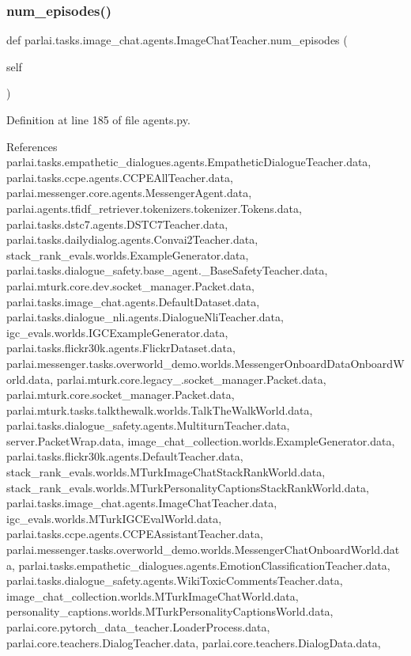 \subsubsection{\texorpdfstring{num\+\_\+episodes()}{num\_episodes()}}
{\footnotesize\ttfamily def parlai.\+tasks.\+image\+\_\+chat.\+agents.\+Image\+Chat\+Teacher.\+num\+\_\+episodes (\begin{DoxyParamCaption}\item[{}]{self }\end{DoxyParamCaption})}



Definition at line 185 of file agents.\+py.



References parlai.\+tasks.\+empathetic\+\_\+dialogues.\+agents.\+Empathetic\+Dialogue\+Teacher.\+data, parlai.\+tasks.\+ccpe.\+agents.\+C\+C\+P\+E\+All\+Teacher.\+data, parlai.\+messenger.\+core.\+agents.\+Messenger\+Agent.\+data, parlai.\+agents.\+tfidf\+\_\+retriever.\+tokenizers.\+tokenizer.\+Tokens.\+data, parlai.\+tasks.\+dstc7.\+agents.\+D\+S\+T\+C7\+Teacher.\+data, parlai.\+tasks.\+dailydialog.\+agents.\+Convai2\+Teacher.\+data, stack\+\_\+rank\+\_\+evals.\+worlds.\+Example\+Generator.\+data, parlai.\+tasks.\+dialogue\+\_\+safety.\+base\+\_\+agent.\+\_\+\+Base\+Safety\+Teacher.\+data, parlai.\+mturk.\+core.\+dev.\+socket\+\_\+manager.\+Packet.\+data, parlai.\+tasks.\+image\+\_\+chat.\+agents.\+Default\+Dataset.\+data, parlai.\+tasks.\+dialogue\+\_\+nli.\+agents.\+Dialogue\+Nli\+Teacher.\+data, igc\+\_\+evals.\+worlds.\+I\+G\+C\+Example\+Generator.\+data, parlai.\+tasks.\+flickr30k.\+agents.\+Flickr\+Dataset.\+data, parlai.\+messenger.\+tasks.\+overworld\+\_\+demo.\+worlds.\+Messenger\+Onboard\+Data\+Onboard\+World.\+data, parlai.\+mturk.\+core.\+legacy\+\_.\+socket\+\_\+manager.\+Packet.\+data, parlai.\+mturk.\+core.\+socket\+\_\+manager.\+Packet.\+data, parlai.\+mturk.\+tasks.\+talkthewalk.\+worlds.\+Talk\+The\+Walk\+World.\+data, parlai.\+tasks.\+dialogue\+\_\+safety.\+agents.\+Multiturn\+Teacher.\+data, server.\+Packet\+Wrap.\+data, image\+\_\+chat\+\_\+collection.\+worlds.\+Example\+Generator.\+data, parlai.\+tasks.\+flickr30k.\+agents.\+Default\+Teacher.\+data, stack\+\_\+rank\+\_\+evals.\+worlds.\+M\+Turk\+Image\+Chat\+Stack\+Rank\+World.\+data, stack\+\_\+rank\+\_\+evals.\+worlds.\+M\+Turk\+Personality\+Captions\+Stack\+Rank\+World.\+data, parlai.\+tasks.\+image\+\_\+chat.\+agents.\+Image\+Chat\+Teacher.\+data, igc\+\_\+evals.\+worlds.\+M\+Turk\+I\+G\+C\+Eval\+World.\+data, parlai.\+tasks.\+ccpe.\+agents.\+C\+C\+P\+E\+Assistant\+Teacher.\+data, parlai.\+messenger.\+tasks.\+overworld\+\_\+demo.\+worlds.\+Messenger\+Chat\+Onboard\+World.\+data, parlai.\+tasks.\+empathetic\+\_\+dialogues.\+agents.\+Emotion\+Classification\+Teacher.\+data, parlai.\+tasks.\+dialogue\+\_\+safety.\+agents.\+Wiki\+Toxic\+Comments\+Teacher.\+data, image\+\_\+chat\+\_\+collection.\+worlds.\+M\+Turk\+Image\+Chat\+World.\+data, personality\+\_\+captions.\+worlds.\+M\+Turk\+Personality\+Captions\+World.\+data, parlai.\+core.\+pytorch\+\_\+data\+\_\+teacher.\+Loader\+Process.\+data, parlai.\+core.\+teachers.\+Dialog\+Teacher.\+data, parlai.\+core.\+teachers.\+Dialog\+Data.\+data, 